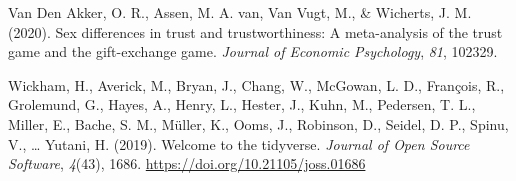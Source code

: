 \documentclass[
  man,floatsintext]{apa6}
\newlength{\cslhangindent}
\newlength{\cslentryspacingunit} %
\newenvironment{CSLReferences}[2] %
 {%
  \setlength{\parindent}{0pt}
  \ifodd #1
  \let\oldpar\par
  \def\par{\hangindent=\cslhangindent\oldpar}
  \fi
  \setlength{\parskip}{#2\cslentryspacingunit}
 }%
 {}
\begin{document}
\begin{CSLReferences}{1}{0}
\leavevmode{}%
Van Den Akker, O. R., Assen, M. A. van, Van Vugt, M., \& Wicherts, J. M. (2020). Sex differences in trust and trustworthiness: A meta-analysis of the trust game and the gift-exchange game. \emph{Journal of Economic Psychology}, \emph{81}, 102329.

\leavevmode{}%
Wickham, H., Averick, M., Bryan, J., Chang, W., McGowan, L. D., François, R., Grolemund, G., Hayes, A., Henry, L., Hester, J., Kuhn, M., Pedersen, T. L., Miller, E., Bache, S. M., Müller, K., Ooms, J., Robinson, D., Seidel, D. P., Spinu, V., \ldots{} Yutani, H. (2019). Welcome to the {tidyverse}. \emph{Journal of Open Source Software}, \emph{4}(43), 1686. \url{https://doi.org/10.21105/joss.01686}

\end{CSLReferences}


\clearpage
\renewcommand{\listfigurename}{Figure captions}
\end{document}
